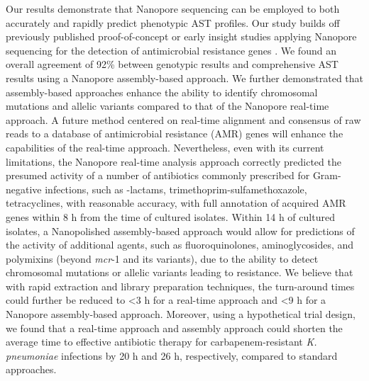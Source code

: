 Our results demonstrate that Nanopore sequencing can be employed to both accurately and rapidly predict phenotypic AST profiles. Our study builds off previously published proof-of-concept or early insight studies applying Nanopore sequencing for the detection of antimicrobial resistance genes \citep{Judge2015-zw, Judge2016-ds, Li2019-op, Van_der_Helm2017-ww, Xia2017-ss, Neuert2018-il, Hasman2014-el, Stoesser2013-se}. We found an overall agreement of 92\% between genotypic results and comprehensive AST results using a Nanopore assembly-based approach. We further demonstrated that assembly-based approaches enhance the ability to identify chromosomal mutations and allelic variants compared to that of the Nanopore real-time approach. A future method centered on real-time alignment and consensus of raw reads to a database of antimicrobial resistance (AMR) genes will enhance the capabilities of the real-time approach. Nevertheless, even with its current limitations, the Nanopore real-time analysis approach correctly predicted the presumed activity of a number of antibiotics commonly prescribed for Gram-negative infections, such as {\textbeta}-lactams, trimethoprim-sulfamethoxazole, tetracyclines, with reasonable accuracy, with full annotation of acquired AMR genes within 8 h from the time of cultured isolates. Within 14 h of cultured isolates, a Nanopolished assembly-based approach would allow for predictions of the activity of additional agents, such as fluoroquinolones, aminoglycosides, and polymixins (beyond \textit{mcr}-1 and its variants), due to the ability to detect chromosomal mutations or allelic variants leading to resistance. We believe that with rapid extraction and library preparation techniques, the turn-around times could further be reduced to 	{\textless}3 h for a real-time approach and {\textless}9 h for a Nanopore assembly-based approach. Moreover, using a hypothetical trial design, we found that a real-time approach and assembly approach could shorten the average time to effective antibiotic therapy for carbapenem-resistant \textit{K. pneumoniae} infections by 20 h and 26 h, respectively, compared to standard approaches.

